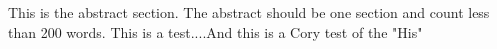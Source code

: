 This is the abstract section. The abstract should be one section and count less than 200 words. This is a test....And this is a Cory test of the "His"